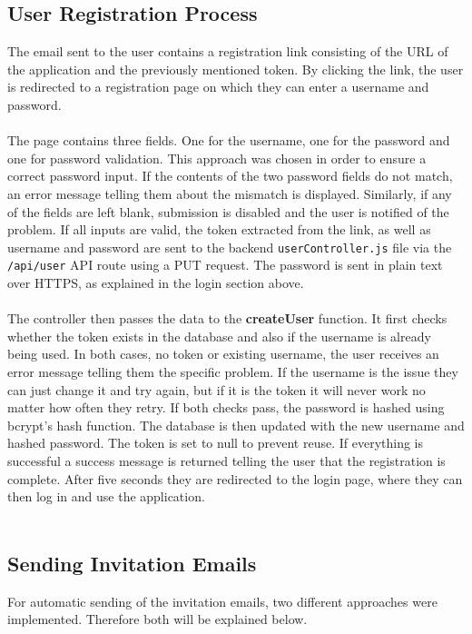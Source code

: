 \documentclass[a4paper,12pt]{report}
\begin{document}
\subsection{User Registration Process}
The email sent to the user contains a registration link consisting of the URL of the application and the previously mentioned token. By clicking the link, the user is redirected to a registration page on which they can enter a username and password. \\\\
The page contains three fields. One for the username, one for the password and one for password validation. This approach was chosen in order to ensure a correct password input. If the contents of the two password fields do not match, an error message telling them about the mismatch is displayed. Similarly, if any of the fields are left blank, submission is disabled and the user is notified of the problem. If all inputs are valid, the token extracted from the link, as well as username and password are sent to the backend \texttt{userController.js} file via the \texttt{/api/user} API route using a PUT request. The password is sent in plain text over HTTPS, as explained in the login section above. \\\\
The controller then passes the data to the \textbf{createUser} function. It first checks whether the token exists in the database and also if the username is already being used. In both cases, no token or existing username, the user receives an error message telling them the specific problem. If the username is the issue they can just change it and try again, but if it is the token it will never work no matter how often they retry. If both checks pass, the password is hashed using bcrypt's hash function. The database is then updated with the new username and hashed password. The token is set to null to prevent reuse. If everything is successful a success message is returned telling the user that the registration is complete. After five seconds they are redirected to the login page, where they can then log in and use the application. \\\\
\subsection{Sending Invitation Emails}
For automatic sending of the invitation emails, two different approaches were implemented. Therefore both will be explained below.
\end{document}
